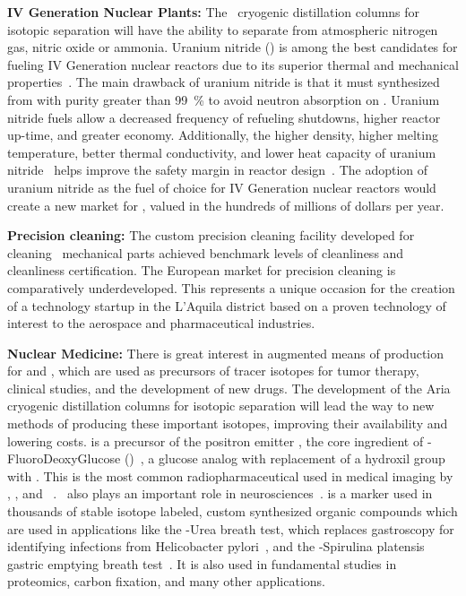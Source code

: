 \begin{asparaenum}
\item[\bf IV Generation Nuclear Plants:] The \Aria\ cryogenic distillation columns for isotopic separation will have the ability to separate  from atmospheric nitrogen gas, nitric oxide or ammonia.  Uranium nitride () is among the best candidates for fueling IV Generation nuclear reactors due to its superior thermal and mechanical properties~\cite{Zakova:2012dy,Youinou:2014dv,Jaques:2015cw}.  The main drawback of uranium nitride is that it must synthesized from  with purity greater than \SI{99}{\percent} to avoid neutron absorption on . Uranium nitride fuels allow a decreased frequency of refueling shutdowns, higher reactor up-time, and greater economy.  Additionally, the higher density, higher melting temperature, better thermal conductivity, and lower heat capacity of uranium nitride~\cite{Hayes:1990hz,Hayes:1990go} helps  improve the safety margin in reactor design~\cite{Zhao:2014ia}.   The adoption of uranium nitride as the fuel of choice for IV Generation nuclear reactors would create a new market for , valued in the hundreds of millions of dollars per year.

\item[\bf Precision cleaning:] The custom precision cleaning facility developed for cleaning \DS\ mechanical parts achieved benchmark levels of cleanliness and cleanliness certification. The European market for precision cleaning is comparatively underdeveloped. This represents a unique occasion for the creation of a technology startup in the L'Aquila district based on a proven technology of interest to the aerospace and pharmaceutical industries.

\item[\bf Nuclear Medicine:] There is great interest in augmented means of production for  and , which are used as precursors of tracer isotopes for tumor therapy, clinical studies, and the development of new drugs.  The development of the Aria cryogenic distillation columns for isotopic separation will lead the way to new methods of producing these important isotopes, improving their availability and lowering costs.  is a precursor of the positron emitter , the core ingredient of -FluoroDeoxyGlucose (\FDG)~\cite{Pacak:1969cf}, a glucose analog with replacement of a hydroxil group with .  This is the most common radiopharmaceutical used in medical imaging by \PET, \TOFPET, and \PETCT~\cite{Som:1980vv,Kelloff:2005hm}.  \FDG\ also plays an important role in neurosciences~\cite{Newberg:2002hq}.   is a marker used in thousands of stable isotope labeled, custom synthesized organic compounds which are used in applications like the -Urea breath test, which replaces gastroscopy for identifying infections from Helicobacter pylori~\cite{Graham:1987cy}, and the -Spirulina platensis gastric emptying breath test~\cite{Bharucha:2012eu}.  It is also used in fundamental studies in proteomics, carbon fixation, and many other applications.

\end{asparaenum}

